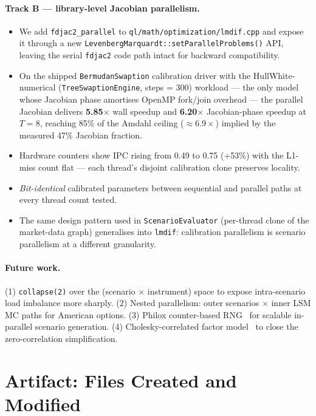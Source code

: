 \documentclass[11pt,twocolumn]{article}
\begin{document}
\paragraph{Track B --- library-level Jacobian parallelism.}
\begin{itemize}[noitemsep]
  \item We add \texttt{fdjac2\_parallel} to
    \texttt{ql/math/optimization/lmdif.cpp} and expose it through a
    new \texttt{LevenbergMarquardt::setParallelProblems()} API,
    leaving the serial \texttt{fdjac2} code path intact for
    backward compatibility.
  \item On the shipped \texttt{BermudanSwaption} calibration driver
    with the HullWhite-numerical (\texttt{TreeSwaptionEngine}, steps
    = 300) workload --- the only model whose Jacobian phase amortises
    OpenMP fork/join overhead --- the parallel Jacobian delivers
    \textbf{5.85$\times$} wall speedup and \textbf{6.20$\times$}
    Jacobian-phase speedup at $T = 8$, reaching 85\% of the Amdahl
    ceiling ($\approx 6.9\times$) implied by the measured 47\%
    Jacobian fraction.
  \item Hardware counters show IPC rising from 0.49 to 0.75 (+53\%)
    with the L1-miss count flat --- each thread's disjoint
    calibration clone preserves locality.
  \item \emph{Bit-identical} calibrated parameters between
    sequential and parallel paths at every thread count tested.
  \item The same design pattern used in \texttt{ScenarioEvaluator}
    (per-thread clone of the market-data graph) generalises into
    \texttt{lmdif}: calibration parallelism is scenario parallelism
    at a different granularity.
\end{itemize}

\paragraph{Future work.}
(1) \texttt{collapse(2)} over the (scenario $\times$ instrument)
space to expose intra-scenario load imbalance more sharply.
(2) Nested parallelism: outer scenarios $\times$ inner LSM MC paths
for American options.
(3) Philox counter-based RNG~\cite{salmon2011} for scalable
in-parallel scenario generation.
(4) Cholesky-correlated factor model~\cite{dixon2011,fusai2006}
to close the zero-correlation simplification.

\section{Artifact: Files Created and Modified}
\label{sec:artifact}
\end{document}
